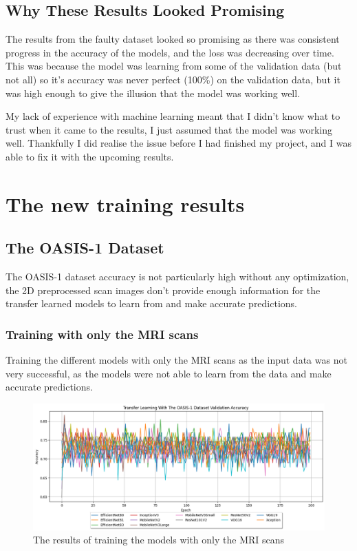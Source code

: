 \documentclass[]{final_report}
\begin{document}
\section{Why These Results Looked Promising}
The results from the faulty dataset looked so promising as there was consistent progress in the accuracy of the models, and the loss was decreasing over time. This was because the model was learning from some of the validation data (but not all) so it's accuracy was never perfect (100\%) on the validation data, but it was high enough to give the illusion that the model was working well.

My lack of experience with machine learning meant that I didn't know what to trust when it came to the results, I just assumed that the model was working well. Thankfully I did realise the issue before I had finished my project, and I was able to fix it with the upcoming results.

\chapter{The new training results}

\section{The OASIS-1 Dataset}

The OASIS-1 dataset accuracy is not particularly high without any optimization, the 2D preprocessed scan images don't provide enough information for the transfer learned models to learn from and make accurate predictions.

\subsection{Training with only the MRI scans}

Training the different models with only the MRI scans as the input data was not very successful, as the models were not able to learn from the data and make accurate predictions. 

\begin{figure}[ht!]
  \centering
  \includegraphics[width=1\textwidth]{images/OASIS-1-Transfer-Learning-Basic-Results.png}
  \caption{The results of training the models with only the MRI scans}
  \label{fig:OASIS-1-Transfer-Learning-Basic-Results-Accuracy}
\end{figure}
\end{document}
